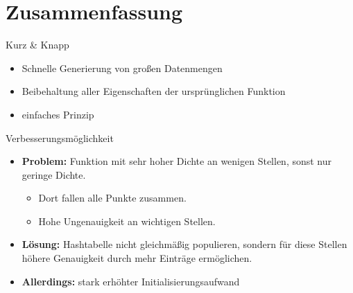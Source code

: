\section{Zusammenfassung}

\begin{frame}{Kurz \& Knapp}    
    \begin{itemize}
        \item Schnelle Generierung von großen Datenmengen
        \item<2-> Beibehaltung aller Eigenschaften der ursprünglichen Funktion
        \item<3-> einfaches Prinzip
    \end{itemize}
\end{frame}

\begin{frame}{Verbesserungsmöglichkeit}   
    \begin{itemize}
        \item\textbf{Problem:} Funktion mit sehr hoher Dichte an wenigen Stellen, sonst nur geringe Dichte.
        \begin{itemize}[label=$\rightarrow$]
            \item<2-> Dort fallen alle Punkte zusammen.
            \item<3-> Hohe Ungenauigkeit an wichtigen Stellen.
        \end{itemize}
        \item<4->\textbf{Lösung:} Hashtabelle nicht gleichmäßig populieren, sondern für diese 
        Stellen höhere Genauigkeit durch mehr Einträge ermöglichen.
        \item<5->\textbf{Allerdings:} stark erhöhter Initialisierungsaufwand
    \end{itemize} 
\end{frame}